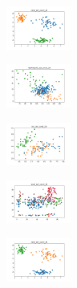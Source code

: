 \begin{figure}[H]
    \hfill
    \begin{subfigure}
        \centering
        \includegraphics[width=0.234\textwidth]{img/am01mej/rand_set_const_20_277451237_clust.png}
    \end{subfigure}
    \hfill
    \begin{subfigure}
        \centering
        \includegraphics[width=0.234\textwidth]{img/am01mej/newthyroid_set_const_20_277451237_clust.png}
    \end{subfigure}
    \hfill
    \begin{subfigure}
        \centering
        \includegraphics[width=0.234\textwidth]{img/am01mej/iris_set_const_20_49258669_clust.png}
    \end{subfigure}
    \hfill
    \begin{subfigure}
        \centering
        \includegraphics[width=0.234\textwidth]{img/am01mej/ecoli_set_const_20_49258669_clust.png}
    \end{subfigure}
    \hfill
    \begin{subfigure}
        \centering
        \includegraphics[width=0.234\textwidth]{img/am01mej/rand_set_const_20_49258669_clust.png}
    \end{subfigure}
    \hfill
    \begin{subfigure}

\end{subfigure}
\end{figure}
